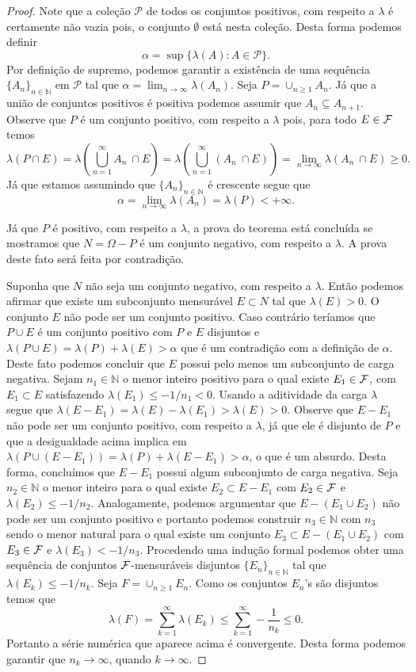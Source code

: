 \begin{proof}
Note que a coleção $\mathscr{P}$ de todos os conjuntos positivos, 
com respeito a $\lambda$ é certamente não vazia pois,
o conjunto $\emptyset$ está nesta coleção. Desta forma 
podemos definir 
\[
\alpha = \sup \{ \lambda(A): A\in\mathscr{P}   \}.
\]
Por definição de supremo, podemos garantir a existência de uma
sequência $\{A_n\}_{n\in\mathbb{N}}$ em $\mathscr{P}$ tal que 
$\alpha = \lim_{n\to\infty} \lambda(A_n)$.
Seja $P=\cup_{n\geq 1}A_n$. Já que a união de conjuntos 
positivos é positiva podemos assumir que $A_n\subseteq A_{n+1}$.
Observe que $P$ é um conjunto positivo, com respeito a $\lambda$
pois, para todo $E\in\mathcal{F}$ temos 
\[
\lambda(P\cap E)
=
\lambda\left( \bigcup_{n=1}^{\infty} A_n \ \cap E \right)
=
\lambda\left( \bigcup_{n=1}^{\infty} (A_n \ \cap E) \right)
=
\lim_{n\to\infty} \lambda(A_n \ \cap E)
\geq 
0.
\]
Já que estamos assumindo que $\{A_n\}_{n\in\mathbb{N}}$ é 
crescente segue que 
\[
\alpha = \lim_{n\to\infty} \lambda(A_n)= \lambda(P)<+\infty.
\]

Já que $P$ é positivo, com respeito a $\lambda$, a 
prova do teorema está concluída se mostramos que 
$N=\Omega-P$ é um conjunto negativo, com respeito a 
$\lambda$. A prova deste fato será feita por contradição.

Suponha que $N$ não seja um conjunto negativo, com respeito 
a $\lambda$. Então podemos afirmar que existe um subconjunto 
mensurável $E\subset N$ tal que $\lambda(E)>0$. 
O conjunto $E$ não pode ser um conjunto positivo.
Caso contrário teríamos que $P\cup E$ é um conjunto 
positivo com $P$ e $E$ disjuntos e
$\lambda(P\cup E)=\lambda(P)+\lambda(E)>\alpha$
que é um contradição com a definição de $\alpha$.
Deste fato podemos concluir que $E$ possui pelo 
menos um subconjunto de carga negativa. 
Sejam $n_1\in \mathbb{N}$ o menor inteiro positivo para o qual 
existe $E_1\in \mathcal{F}$, com $E_1\subset E$ 
satisfazendo $\lambda(E_1)\leq -1/n_1<0$.
Usando a aditividade da carga $\lambda$ segue que 
$\lambda(E-E_1)=\lambda(E)-\lambda(E_1)>\lambda(E)>0$.
Observe que $E-E_1$ não pode ser um conjunto positivo,
com respeito a $\lambda$, já que ele é disjunto 
de $P$ e que a desigualdade acima implica em 
$\lambda(P\cup (E-E_1))= \lambda(P)+\lambda(E-E_1) >\alpha$,
o que é um absurdo. 
Desta forma, concluímos que $E-E_1$ possui algum subconjunto de 
carga negativa. Seja $n_2\in\mathbb{N}$ o menor inteiro para o
qual existe $E_2\subset E-E_1$ com $E_2\in \mathcal{F}$ e 
$\lambda(E_2)\leq -1/n_2$. Analogamente, podemos 
argumentar que $E-(E_1\cup E_2)$ não pode ser um conjunto 
positivo e portanto podemos construir 
$n_3\in\mathbb{N}$ com $n_3$ sendo o menor 
natural para o qual existe um conjunto 
$E_3\subset E-(E_1\cup E_2)$ com $E_3\in \mathcal{F}$ e 
$\lambda(E_3)<-1/n_3$. Procedendo uma indução 
formal podemos obter uma sequência de conjuntos 
$\mathcal{F}$-mensuráveis disjuntos $\{E_n\}_{n\in\mathbb{N}}$
tal que $\lambda(E_k)\leq -1/n_k$.
Seja $F=\cup_{n\geq 1} E_n$. Como os conjuntos $E_n$'s são disjuntos
temos que 
\[
\lambda(F)
=
\sum_{k=1}^{\infty}\lambda(E_k)
\leq 
\sum_{k=1}^{\infty} -\frac{1}{n_k}
\leq 
0.
\]
Portanto a série numérica que aparece acima é convergente.
Desta forma podemos garantir que $n_k\to \infty$, quando $k\to\infty$.
\end{proof}